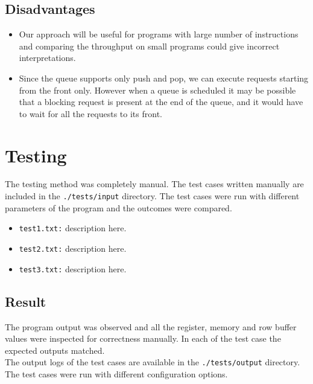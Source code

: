 \documentclass[hidelinks,12pt]{article}
\begin{document}
\subsection{Disadvantages}
\begin{itemize}
    \item Our approach will be useful for programs with large number of instructions and comparing the throughput on small programs could give incorrect interpretations.
    \item Since the queue supports only push and pop, we can execute requests starting from the front only. However when a queue is scheduled it may be possible that a blocking request is
          present at the end of the queue, and it would have to wait for all the requests to its front.
\end{itemize}
\section{Testing}

The testing method was completely manual. The test cases written manually are included in the \verb|./tests/input| directory. The test cases were run with different parameters
of the program and the outcomes were compared.
\begin{itemize}
    \item \verb|test1.txt:| description here.
    \item \verb|test2.txt:| description here.
    \item \verb|test3.txt:| description here.
\end{itemize}

\subsection{Result}
The program output was observed and all the register, memory and row buffer values were inspected for correctness manually. In each of the test case the expected outputs matched.\\[0.2cm]
The output logs of the test cases are available in the \verb|./tests/output| directory. The test cases were run with different configuration options.
\end{document}
